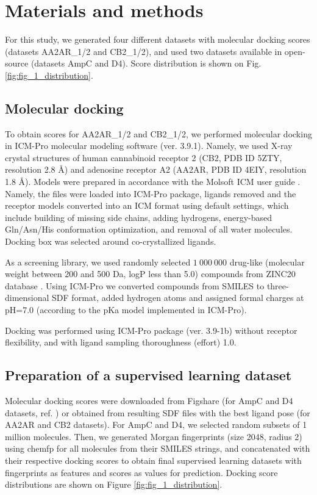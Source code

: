\section{Materials and methods}
For this study, we generated four different datasets with molecular docking scores (datasets AA2AR\_1/2 and CB2\_1/2), and used two datasets available in open-source \cite{ultralarge_docking_first} (datasets AmpC and D4). Score distribution is shown on Fig. \ref{fig:fig_1_distribution}.

\subsection{Molecular docking}
To obtain scores for AA2AR\_1/2 and CB2\_1/2, we performed molecular docking in ICM-Pro molecular modeling software (ver. 3.9.1). Namely, we used X-ray crystal structures of human cannabinoid receptor 2 (CB2, PDB ID 5ZTY, resolution 2.8 \AA ) and adenosine receptor A2 (AA2AR, PDB ID 4EIY, resolution 1.8 \AA). Models were prepared in accordance with the Molsoft ICM user guide \cite{molsoft_guide}. Namely, the files were loaded into ICM-Pro package, ligands removed and the receptor models converted into an ICM format using default settings, which include building of missing side chains, adding hydrogens, energy-based Gln/Asn/His conformation optimization, and removal of all water molecules. Docking box was selected around co-crystallized ligands.

As a screening library, we used randomly selected $1\ 000\ 000$ drug-like (molecular weight between 200 and 500 Da, logP less than 5.0) compounds from ZINC20 database \cite{Irwin2020ZINC20Discovery}. Using ICM-Pro we converted compounds from SMILES to three-dimensional SDF  format, added hydrogen atoms and assigned formal charges at pH=7.0 (according to the pKa model implemented in ICM-Pro). 

Docking was performed using ICM-Pro package (ver. 3.9-1b) without receptor flexibility, and with ligand sampling thoroughness (effort) 1.0.

\subsection{Preparation of a supervised learning dataset}
Molecular docking scores were downloaded from Figshare (for AmpC and D4 datasets, ref. \cite{ultralarge_docking_first}) or obtained from resulting SDF files with the best ligand pose (for AA2AR and CB2 datasets). For AmpC and D4, we selected random subsets of 1 million molecules. Then, we generated Morgan fingerprints (size 2048, radius 2) using chemfp \cite{Dalke2019} for all molecules from their SMILES strings, and concatenated with their respective docking scores to obtain final supervised learning datasets with fingerprints as features and scores as values for prediction. Docking score distributions are shown on Figure \ref{fig:fig_1_distribution}.



